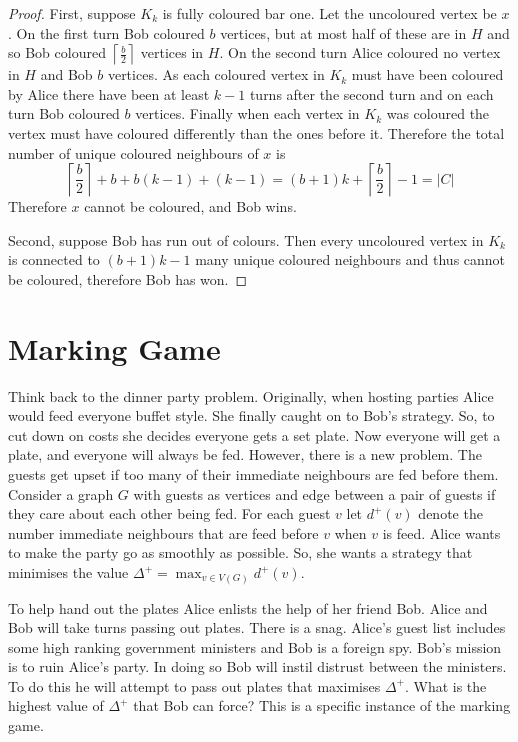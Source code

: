 \begin{proof}
First, suppose $K_k$ is fully coloured bar one. Let the uncoloured vertex be $x$. On the first turn Bob coloured $b$ vertices, but at most half of these are in $H$ and so Bob coloured $\left\lceil \frac{b}{2}\right\rceil$ vertices in $H$. On the second turn Alice coloured no vertex in $H$ and Bob $b$ vertices. As each coloured vertex in $K_k$ must have been coloured by Alice there have been at least $k-1$ turns after the second turn and on each turn Bob coloured $b$ vertices. Finally when each vertex in $K_k$ was coloured the vertex must have coloured differently than the ones before it. Therefore the total number of unique coloured neighbours of $x$ is 
%
\[\left\lceil \frac{b}{2}\right\rceil+b +b(k-1)+(k-1)=(b+1)k+\left\lceil \frac{b}{2}\right\rceil-1 = |C|\]
%
Therefore $x$ cannot be coloured, and Bob wins.

Second, suppose Bob has run out of colours. Then every uncoloured vertex in $K_k$ is connected to $(b+1)k-1$ many unique coloured neighbours and thus cannot be coloured, therefore Bob has won.
\end{proof}

\section{Marking Game}\label{sec:marking_game}

Think back to the dinner party problem. Originally, when hosting parties Alice would feed everyone buffet style. She finally caught on to Bob's strategy. So, to cut down on costs she decides everyone gets a set plate. Now everyone will get a plate, and everyone will always be fed. However, there is a new problem. The guests get upset if too many of their immediate neighbours are fed before them. Consider a graph $G$ with guests as vertices and edge between a pair of guests if they care about each other being fed. For each guest $v$ let $d^+(v)$ denote the number immediate neighbours that are feed before $v$ when $v$ is feed. Alice wants to make the party go as smoothly as possible. So, she wants a strategy that minimises the value $\Delta^+=\max_{v\in V(G)} d^+(v)$.

To help hand out the plates Alice enlists the help of her friend Bob. Alice and Bob will take turns passing out plates. There is a snag. Alice's guest list includes some high ranking government ministers and Bob is a foreign spy. Bob's mission is to ruin Alice's party. In doing so Bob will instil distrust between the ministers. To do this he will attempt to pass out plates that maximises $\Delta^+$. What is the highest value of $\Delta^+$ that Bob can force? This is a specific instance of the marking game.

